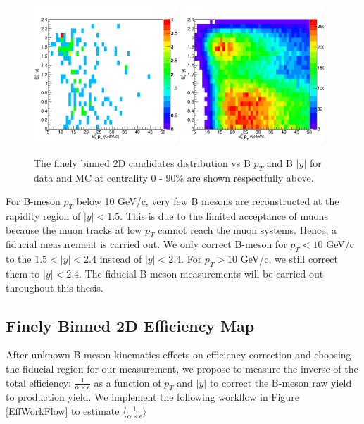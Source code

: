 \begin{figure}[h]
\begin{center}
\includegraphics[width= 0.48\textwidth]{Figures/Chapter5/hBptByData.png}
\includegraphics[width= 0.48\textwidth]{Figures/Chapter5/hBptByMC.png}
\caption{The finely binned 2D candidates distribution vs B $p_T$ and B $|y|$ for data and MC at centrality 0 - 90\% are shown respectfully above.}
\label{Bs2DRECO}
\end{center}
\end{figure}

For B-meson $p_T$ below 10 GeV/c, very few B mesons are reconstructed at the rapidity region of $|y| < 1.5$. This is due to the limited acceptance of muons because the muon tracks at low $p_T$ cannot reach the muon systems. Hence, a fiducial measurement is carried out. We only correct B-meson for $p_T < 10$ GeV/c to the $1.5 < |y| < 2.4$ instead of $|y| < 2.4$. For $p_T > 10$ GeV/c, we still correct them to $|y| < 2.4$. The fiducial B-meson measurements will be carried out throughout this thesis.

\subsection{Finely Binned 2D Efficiency Map}

After unknown B-meson kinematics effects on efficiency correction and choosing the fiducial region for our measurement, we propose to measure the inverse of the total efficiency: $\frac{1}{\alpha \times \epsilon}$ as a function of $p_T$ and $|y|$ to correct the B-meson raw yield to production yield. We implement the following workflow in Figure \ref{EffWorkFlow} to estimate $\langle \frac{1}{\alpha \times \epsilon} \rangle$


